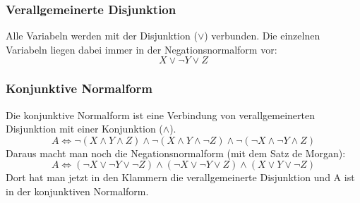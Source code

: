 \subsubsection{Verallgemeinerte Disjunktion}
  Alle Variabeln werden mit der Disjunktion ($\vee$) verbunden. 
  Die einzelnen Variabeln liegen dabei immer in der Negationsnormalform vor:
  \[ X \vee \neg Y \vee Z\]
\subsubsection{Konjunktive Normalform}
  Die konjunktive Normalform ist eine Verbindung von verallgemeinerten Disjunktion
  mit einer Konjunktion ($\wedge$). 
  \[ A \Leftrightarrow \neg(X \wedge Y \wedge Z) \wedge \neg(X \wedge Y \wedge \neg Z) \wedge \neg(\neg X \wedge \neg Y \wedge Z) \]
  Daraus macht man noch die Negationsnormalform (mit dem Satz de Morgan):
  \[ A \Leftrightarrow (\neg X \vee \neg Y \vee \neg Z) \wedge (\neg X \vee \neg Y \vee Z) \wedge (X \vee Y \vee \neg Z) \]
  Dort hat man jetzt in den Klammern die verallgemeinerte Disjunktion und A ist in der konjunktiven Normalform.

\begin{comment} %
\subsection{Aussageformen und Prädikate}
  \begin{itemize}
    \item Der Wahrheitswert einer Aussageform hängt von einer oder mehreren Variablen ab.
    \item Aussageformen sind unbestimmt, weil nicht klar ist, welcher Wert
      für eine Variable eingesetzt wird.
    \item Der Wert, welcher für eine Aussageform eingesetzt wird, heisst Subjekt.
    \item Ein Subjekt kann zulässig (Aussage ist wahr oder falsch) oder unzulässig
      (Aussage ist nicht auswertbar) sein.
    \item Aussagen und Aussageformen bestehen aus dem Subjekt (Variable)
      und dem Prädikat (Beschreibung, Eigenschaft).
  \end{itemize}
\end{comment}

